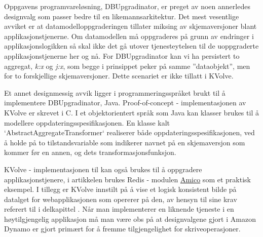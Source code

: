 Oppgavens programvareløsning, DBUpgradinator, er preget av noen annerledes designvalg som passer bedre til en likemannsarkitektur. Det mest vesentlige avviket er at datamodelloppgraderingen tillater miksing av skjemaversjoner blant applikasjonstjenerne. Om datamodellen må oppgraderes på grunn av endringer i applikasjonslogikken så skal ikke det gå utover tjenesteytelsen til de uoppgraderte applikasjonstjenerne her og nå. For DBUpgradinator kan vi ha persistert to aggregat, \emph{k:x} og \emph{j:x}, som begge i prinsippet peker på samme ''dataobjekt'', men for to forskjellige skjemaversjoner. Dette scenariet er ikke tillatt i KVolve.

Et annet designmessig avvik ligger i programmeringsspråket brukt til å implementere DBUpgradinator, Java. Proof-of-concept - implementasjonen av KVolve er skrevet i C. I et objektorientert språk som Java kan klasser brukes til å modellere oppdateringsspesifikasjonen. En klasse kalt `AbstractAggregateTransformer` realiserer både oppdateringsspesifikasjonen, ved å holde på to tilstandsvariable som indikerer navnet på en skjemaversjon som kommer før en annen, og dets transformasjonsfunksjon.

KVolve - implementasjonen til \cite{saur2016} kan også brukes til å oppgradere applikasjonstjenere, i artikkelen brukes Redis - modulen \underline{Amico} som et praktisk eksempel. I tillegg er KVolve innstilt på å vise et logisk konsistent bilde på datalget for webapplikasjonen som opererer på den, av hensyn til \cite{dumitras2009nodowntime} sine krav referert til i delkapittel \label{imagolist}. Når man implementerer en liknende tjeneste i en høytilgjengelig applikasjon må man være obs på at designvalgene gjort i Amazon Dynamo er gjort primært for å fremme tilgjengelighet for skriveoperasjoner.